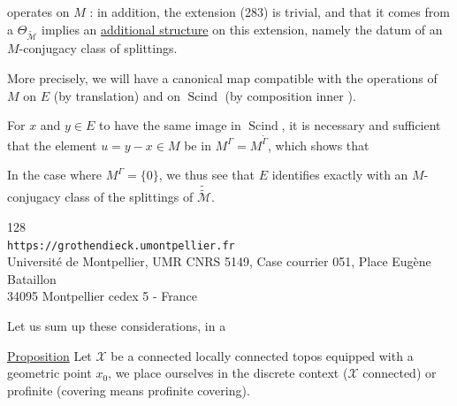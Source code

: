 operates   on $M$ : in addition, the extension (283) is trivial, and   that it comes from a $\Theta_{\widetilde{\mathcal M}}$ implies an \uline{additional structure} on this extension, namely the datum of an $M$-conjugacy class of splittings.

More precisely, we will have a canonical map
compatible with the operations of $M$ on $E$ (by translation) and on $\operatorname{Scind}$ (by composition  inner ).

For $x$ and $y\in E$ to have the same image in $\operatorname{Scind}$, it is necessary and sufficient that the element $u=y-x\in M$ be in $M^\Gamma=M^{\widetilde\Gamma}$, which shows that
\diagram{
\[
\begin{tikzcd}[column sep=large,row sep=large]
\text{the homomorphism }E \arrow[r,no head] & \operatorname{Scind}\text{ is injective} \\
& \text{iff}\quad M^\Gamma=\{0\}\quad .
\end{tikzcd}
\tag{286}
\]
}

In the case where $M^\Gamma=\{0\}$, we thus see that $E$ identifies exactly with an $M$-conjugacy class of the splittings of $\widetilde{\widetilde{\mathcal M}}$.


\begin{center}
\small
128\\
\texttt{https://grothendieck.umontpellier.fr}\\
Université de Montpellier, UMR CNRS 5149, Case courrier 051, Place Eugène Bataillon\\
34095 Montpellier cedex 5 - France
\end{center}


Let us sum up these considerations, in a

\uline{Proposition} Let $\mathcal X$ be a  connected locally connected topos equipped with a geometric point $x_0$, we place ourselves in the discrete context ($\mathcal X$   connected) or profinite (covering means profinite covering).

